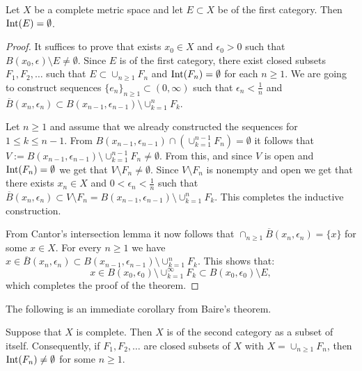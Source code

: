 \documentclass[11pt,a4paper]{article}
\begin{document}
\begin{theorem}
  Let $X$ be a complete metric space and let $E \subset X$ be of the first
  category. Then $\operatorname{Int}(E) = \emptyset$.
\end{theorem}
\begin{proof}
  It suffices to prove that exists $x_0 \in X$ and $\epsilon_0 > 0$ such
  that $B(x_0,\epsilon) \setminus E \neq \emptyset$. Since $E$ is of
  the first category, there exist closed subsets $F_1,F_2,\dots$ such that
  $E \subset \cup_{n \geq 1}{F_n}$ and $\operatorname{Int}(F_n) = \emptyset$ for each
  $n \geq 1$. We are going to construct sequences 
  $\{e_n\}_{n \geq 1} \subset (0,\infty)$ such that 
  $\epsilon_n < \frac{1}{n}$ and $\overline{B}(x_n,\epsilon_n) \subset
  B(x_{n-1},\epsilon_{n-1}) \setminus \cup_{k=1}^{n}{F_k}$. 
  
  Let $n \geq 1$ and assume that we already constructed the sequences
  for $1 \le k \le n-1$. From 
  $B(x_{n-1},\epsilon_{n-1}) \cap (\cup_{k=1}^{n-1}{F_n}) = \emptyset$ 
  it follows that 	
  $V:=B(x_{n-1},\epsilon_{n-1}) \setminus \cup_{k=1}^{n-1}{F_n} 
  \neq \emptyset$. From this, and since $V$ is open and 
  $\operatorname{Int}(F_n) = \emptyset$ we get that $V \setminus F_n \neq \emptyset$.
  Since $V \setminus F_n$ is nonempty and open we get that there exists
  $x_n \in X$ and $0 < \epsilon_n < \frac{1}{n}$ such that
  $\overline{B}(x_n,\epsilon_n) \subset V \setminus F_n = 
  B(x_{n-1},\epsilon_{n-1}) \setminus \cup_{k=1}^{n}{F_k}$.
  This completes the inductive construction.
  
  From Cantor's intersection lemma it now follows that
  $\cap_{n \geq 1}{\overline{B}(x_n,\epsilon_n)} = \{x\}$ for some
  $x \in X$. For every $n \geq 1$ we have 
  $x \in \overline{B}(x_n,\epsilon_n) \subset 
  B(x_{n-1},\epsilon_{n-1}) \setminus \cup_{k=1}^{n}{F_k}$. This
  shows that:
  \[
    x \in B(x_{0},\epsilon_{0}) \setminus \cup_{k=1}^{\infty}{F_k}
    \subset B(x_0,\epsilon_0) \setminus E,
  \]
  which completes the proof of the theorem.
\end{proof}
 
The following is an immediate corollary from Baire's theorem.

\begin{corollary}
  Suppose that $X$ is complete. Then $X$ is of the second category as a
  subset of itself. Consequently, if $F_1,F_2,\dots$ are closed subsets 
  of $X$ with $X = \cup_{n \geq 1}{F_n}$, then $\operatorname{Int}(F_n) \neq \emptyset$ 
  for some $n \geq 1$.
\end{corollary}
\end{document}
